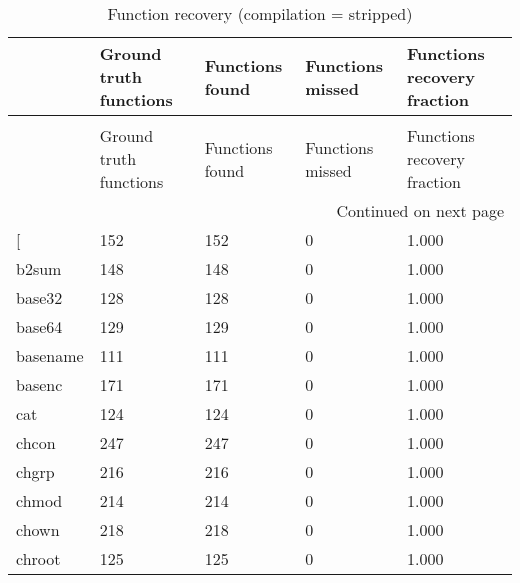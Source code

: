 \begin{longtable}{lp{3.0cm}p{3.0cm}p{3.0cm}p{3.0cm}}
\caption{Function recovery (compilation = stripped)}
\label{table:functions-O0-strip}\\
\toprule
{} &  Ground truth functions &  Functions found &  Functions missed &  Functions recovery fraction \\
\midrule
\endfirsthead
\caption[]{Function recovery (compilation = stripped)} \\
\toprule
{} &  Ground truth functions &  Functions found &  Functions missed &  Functions recovery fraction \\
\midrule
\endhead
\midrule
\multicolumn{5}{r}{{Continued on next page}} \\
\midrule
\endfoot

\bottomrule
\endlastfoot
{[}         &                     152 &              152 &                 0 &                        1.000 \\
b2sum     &                     148 &              148 &                 0 &                        1.000 \\
base32    &                     128 &              128 &                 0 &                        1.000 \\
base64    &                     129 &              129 &                 0 &                        1.000 \\
basename  &                     111 &              111 &                 0 &                        1.000 \\
basenc    &                     171 &              171 &                 0 &                        1.000 \\
cat       &                     124 &              124 &                 0 &                        1.000 \\
chcon     &                     247 &              247 &                 0 &                        1.000 \\
chgrp     &                     216 &              216 &                 0 &                        1.000 \\
chmod     &                     214 &              214 &                 0 &                        1.000 \\
chown     &                     218 &              218 &                 0 &                        1.000 \\
chroot    &                     125 &              125 &                 0 &                        1.000 \\

\end{longtable}
